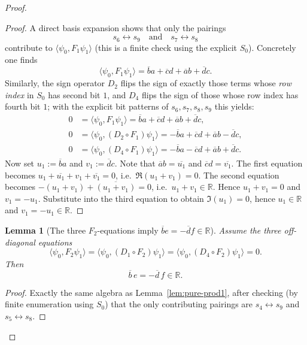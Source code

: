 \documentclass[11pt]{article}
\newtheorem{lemma}{Lemma}
\begin{document}
\begin{proof}
\begin{proof}
A direct basis expansion shows that only the pairings
\[
s_6\leftrightarrow s_9
\quad\text{and}\quad
s_7\leftrightarrow s_8
\]
contribute to $\langle \psi_0,F_1\psi_1\rangle$ (this is a finite check using the explicit $S_0$).
Concretely one finds
\[
\langle \psi_0,F_1\psi_1\rangle
=
\overline{b}a+\overline{c}d+\overline{a}b+\overline{d}c.
\]
Similarly, the sign operator $D_2$ flips the sign of exactly those terms whose \emph{row index} in $S_0$ has second bit $1$,
and $D_4$ flips the sign of those whose row index has fourth bit $1$; with the explicit bit patterns of $s_6,s_7,s_8,s_9$ this yields:
\begin{align*}
0&=\langle \psi_0,F_1\psi_1\rangle
=\overline{b}a+\overline{c}d+\overline{a}b+\overline{d}c,\\
0&=\langle \psi_0,(D_2\!\circ F_1)\psi_1\rangle
=-\overline{b}a+\overline{c}d+\overline{a}b-\overline{d}c,\\
0&=\langle \psi_0,(D_4\!\circ F_1)\psi_1\rangle
=-\overline{b}a-\overline{c}d+\overline{a}b+\overline{d}c.
\end{align*}
Now set $u_1:=\overline{b}a$ and $v_1:=\overline{d}c$. Note that $\overline{a}b=\overline{u_1}$ and
$\overline{c}d=\overline{v_1}$. The first equation becomes
$u_1+\overline{u_1}+v_1+\overline{v_1}=0$, i.e.\ $\Re(u_1+v_1)=0$.
The second equation becomes $-(u_1+v_1)+\overline{(u_1+v_1)}=0$, i.e.\ $u_1+v_1\in\mathbb R$.
Hence $u_1+v_1=0$ and $v_1=-u_1$.
Substitute into the third equation to obtain $\Im(u_1)=0$, hence $u_1\in\mathbb R$ and $v_1=-u_1\in\mathbb R$.
\end{proof}

\begin{lemma}[The three $F_2$-equations imply $\overline{b}e=-\overline{d}f\in\mathbb R$]
\label{lem:pure-prod2}
Assume the three off-diagonal equations
\[
\langle \psi_0,F_2\psi_1\rangle=\langle \psi_0,(D_1\!\circ F_2)\psi_1\rangle=\langle \psi_0,(D_4\!\circ F_2)\psi_1\rangle=0.
\]
Then
\begin{equation}
\overline{b}\,e=-\overline{d}\,f\in\mathbb R.
\label{eq:pure-prod2}
\end{equation}
\end{lemma}

\begin{proof}
Exactly the same algebra as Lemma~\ref{lem:pure-prod1}, after checking (by finite enumeration using $S_0$)
that the only contributing pairings are $s_4\leftrightarrow s_9$ and $s_5\leftrightarrow s_8$.
\end{proof}


\end{proof}
\end{document}
